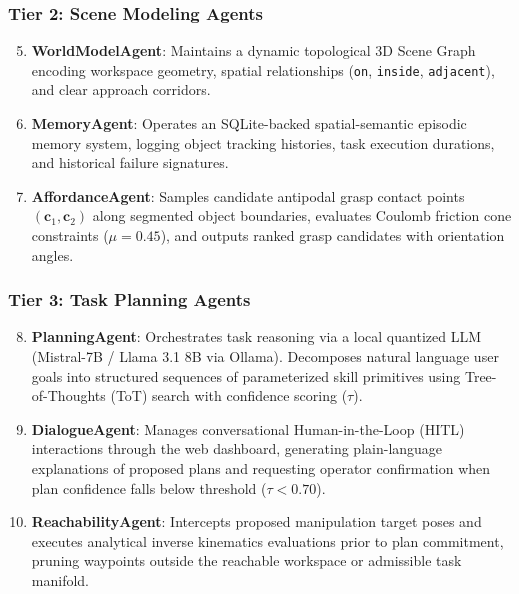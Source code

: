 \documentclass[journal]{IEEEtran}
\begin{document}
\subsubsection{Tier 2: Scene Modeling Agents}
\begin{enumerate}
    \setcounter{enumi}{4}
    \item \textbf{WorldModelAgent}: Maintains a dynamic topological 3D Scene Graph encoding workspace geometry, spatial relationships (\texttt{on}, \texttt{inside}, \texttt{adjacent}), and clear approach corridors.
    \item \textbf{MemoryAgent}: Operates an SQLite-backed spatial-semantic episodic memory system, logging object tracking histories, task execution durations, and historical failure signatures.
    \item \textbf{AffordanceAgent}: Samples candidate antipodal grasp contact points $(\mathbf{c}_1, \mathbf{c}_2)$ along segmented object boundaries, evaluates Coulomb friction cone constraints ($\mu = 0.45$), and outputs ranked grasp candidates with orientation angles.
\end{enumerate}

\subsubsection{Tier 3: Task Planning Agents}
\begin{enumerate}
    \setcounter{enumi}{7}
    \item \textbf{PlanningAgent}: Orchestrates task reasoning via a local quantized LLM (Mistral-7B / Llama 3.1 8B via Ollama). Decomposes natural language user goals into structured sequences of parameterized skill primitives using Tree-of-Thoughts (ToT) search with confidence scoring ($\tau$).
    \item \textbf{DialogueAgent}: Manages conversational Human-in-the-Loop (HITL) interactions through the web dashboard, generating plain-language explanations of proposed plans and requesting operator confirmation when plan confidence falls below threshold ($\tau < 0.70$).
    \item \textbf{ReachabilityAgent}: Intercepts proposed manipulation target poses and executes analytical inverse kinematics evaluations prior to plan commitment, pruning waypoints outside the reachable workspace or admissible task manifold.
\end{enumerate}
\end{document}

